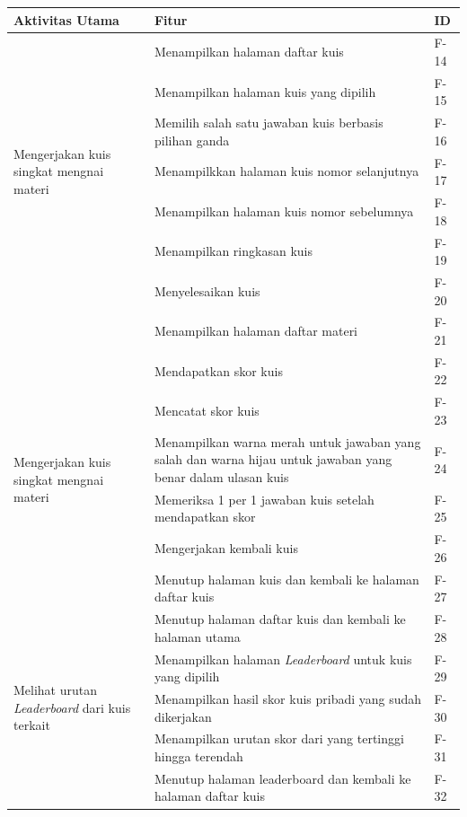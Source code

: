 \newpage
\begin{table}[H]
	\begin{tabular}{|m{3cm}|p{}|p{1cm}|}
		\hline
		\centering\textbf{Aktivitas Utama} & \centering\textbf{Fitur} & \multicolumn{1}{m{1cm}|}{\centering \textbf{ID}} \\
		\hline
		\multirow{7}{2.5cm}{Mengerjakan kuis singkat mengnai materi} &Menampilkan halaman daftar kuis& F-14 \\
		\cline{2-3}
		&Menampilkan halaman kuis yang dipilih& F-15 \\
		\cline{2-3}
		&Memilih salah satu jawaban kuis berbasis pilihan ganda& F-16 \\
		\cline{2-3}
		&Menampilkkan halaman kuis nomor selanjutnya& F-17 \\
		\cline{2-3}
		&Menampilkan halaman kuis nomor sebelumnya& F-18 \\
		\cline{2-3}
		&Menampilkan ringkasan kuis& F-19 \\
		\cline{2-3}
		&Menyelesaikan kuis& F-20 \\
		\hline
		\multirow{8}{2.5cm}{Mengerjakan kuis singkat mengnai materi} &Menampilkan halaman daftar materi& F-21 \\
		\cline{2-3}
		&Mendapatkan skor kuis& F-22 \\
		\cline{2-3}
		&Mencatat skor kuis& F-23 \\
		\cline{2-3}
		&Menampilkan warna merah untuk jawaban yang salah dan warna hijau untuk jawaban yang benar dalam ulasan kuis& F-24 \\
		\cline{2-3}
		&Memeriksa 1 per 1 jawaban kuis setelah mendapatkan skor& F-25 \\
		\cline{2-3}
		&Mengerjakan kembali kuis& F-26 \\
		\cline{2-3}
		&Menutup halaman kuis dan kembali ke halaman daftar kuis& F-27 \\
		\cline{2-3}
		&Menutup halaman daftar kuis dan kembali ke halaman utama& F-28 \\
		\hline
		\multirow{3}{3cm}{Melihat urutan \textit{Leaderboard} dari kuis terkait} &Menampilkan halaman \textit{Leaderboard} untuk kuis yang dipilih & F-29 \\
		\cline{2-3}
		&Menampilkan hasil skor kuis pribadi yang sudah dikerjakan& F-30 \\
		\cline{2-3}
		&Menampilkan urutan skor dari yang tertinggi hingga terendah& F-31 \\
		\cline{2-3}
		&Menutup halaman leaderboard dan kembali ke halaman daftar kuis& F-32\\

\end{tabular}
\end{table}
